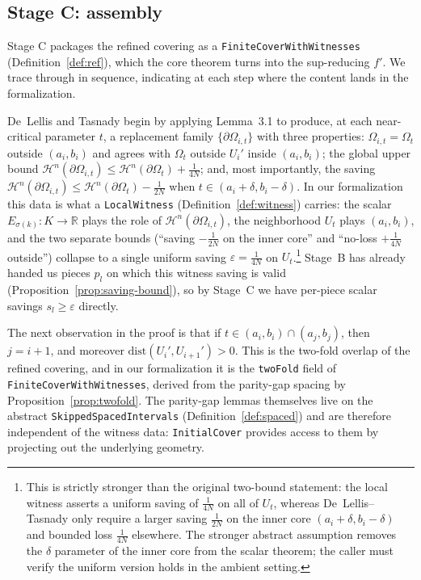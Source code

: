 \documentclass[11pt,reqno]{amsart}
\theoremstyle{definition}
\begin{document}
\subsection{Stage C: assembly}

Stage C packages the refined covering as a
\texttt{FiniteCoverWithWitnesses} (Definition~\ref{def:ref}),
which the core theorem turns into the sup-reducing $f'$. We trace
through \cite[\S3.2, Step~2]{DLT13} in sequence, indicating at
each step where the content lands in the formalization.

De~Lellis and Tasnady begin by applying Lemma~3.1 to produce, at
each near-critical parameter $t$, a replacement family
$\{\partial \Omega_{i,t}\}$ with three properties:
$\Omega_{i,t} = \Omega_t$ outside $(a_i, b_i)$ and agrees with
$\Omega_t$ outside $U_i'$ inside $(a_i, b_i)$; the global upper
bound $\mathcal{H}^n(\partial \Omega_{i,t}) \le
\mathcal{H}^n(\partial \Omega_t) + \tfrac{1}{4N}$; and, most
importantly, the saving
$\mathcal{H}^n(\partial \Omega_{i,t}) \le
\mathcal{H}^n(\partial \Omega_t) - \tfrac{1}{2N}$ when
$t \in (a_i + \delta, b_i - \delta)$. In our formalization this
data is what a \texttt{LocalWitness} (Definition~\ref{def:witness})
carries: the scalar $E_{\sigma(k)} : K \to \mathbb{R}$ plays the
role of $\mathcal{H}^n(\partial \Omega_{i,t})$, the neighborhood
$U_t$ plays $(a_i, b_i)$, and the two separate bounds
(``saving $-\tfrac{1}{2N}$ on the inner core'' and ``no-loss
$+\tfrac{1}{4N}$ outside'') collapse to a single uniform saving
$\varepsilon = \tfrac{1}{4N}$ on $U_t$.\footnote{This is strictly
stronger than the original two-bound statement: the local witness
asserts a uniform saving of $\tfrac{1}{4N}$ on all of $U_t$,
whereas De~Lellis--Tasnady only require a larger saving
$\tfrac{1}{2N}$ on the inner core $(a_i+\delta, b_i-\delta)$ and
bounded loss $\tfrac{1}{4N}$ elsewhere. The stronger abstract
assumption removes the $\delta$ parameter of the inner core from
the scalar theorem; the caller must verify the uniform version
holds in the ambient setting.}
Stage~B has already handed us pieces $p_l$ on which this witness
saving is valid (Proposition~\ref{prop:saving-bound}), so by
Stage~C we have per-piece scalar savings $s_l \ge \varepsilon$
directly.

The next observation in the proof is that if $t \in (a_i, b_i)
\cap (a_j, b_j)$, then $j = i+1$, and moreover
$\mathrm{dist}(U_i', U_{i+1}') > 0$. This is the two-fold overlap
of the refined covering, and in our formalization it is the
\texttt{twoFold} field of \texttt{FiniteCoverWithWitnesses},
derived from the parity-gap spacing by
Proposition~\ref{prop:twofold}. The parity-gap lemmas themselves
live on the abstract \texttt{SkippedSpacedIntervals}
(Definition~\ref{def:spaced}) and are therefore independent of
the witness data: \texttt{InitialCover} provides access to them
by projecting out the underlying geometry.
\end{document}
